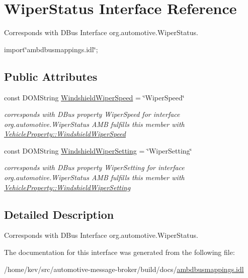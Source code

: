 \hypertarget{interfaceWiperStatus}{\section{Wiper\+Status Interface Reference}
\label{interfaceWiperStatus}
}


Corresponds with D\+Bus Interface org.\+automotive.\+Wiper\+Status.  




{\ttfamily import\char`\"{}ambdbusmappings.\+idl\char`\"{};}

\subsection*{Public Attributes}
\begin{DoxyCompactItemize}
\item 
\hypertarget{interfaceWiperStatus_a2450e48040a1ab0eacf41a069026801b}{const D\+O\+M\+String \hyperlink{interfaceWiperStatus_a2450e48040a1ab0eacf41a069026801b}{Windshield\+Wiper\+Speed} = \char`\"{}Wiper\+Speed\char`\"{}}\label{interfaceWiperStatus_a2450e48040a1ab0eacf41a069026801b}

\begin{DoxyCompactList}\small\item\em corresponds with D\+Bus property Wiper\+Speed for interface org.\+automotive.\+Wiper\+Status A\+M\+B fulfills this member with \hyperlink{classVehicleProperty_a00117ff074e7d12b38493455d1230b80}{Vehicle\+Property\+::\+Windshield\+Wiper\+Speed} \end{DoxyCompactList}\item 
\hypertarget{interfaceWiperStatus_a85849714f517ea47be7dded2874e4ed0}{const D\+O\+M\+String \hyperlink{interfaceWiperStatus_a85849714f517ea47be7dded2874e4ed0}{Windshield\+Wiper\+Setting} = \char`\"{}Wiper\+Setting\char`\"{}}\label{interfaceWiperStatus_a85849714f517ea47be7dded2874e4ed0}

\begin{DoxyCompactList}\small\item\em corresponds with D\+Bus property Wiper\+Setting for interface org.\+automotive.\+Wiper\+Status A\+M\+B fulfills this member with \hyperlink{classVehicleProperty_aedc65affd0ac592324226b51a0d1b877}{Vehicle\+Property\+::\+Windshield\+Wiper\+Setting} \end{DoxyCompactList}\end{DoxyCompactItemize}


\subsection{Detailed Description}
Corresponds with D\+Bus Interface org.\+automotive.\+Wiper\+Status. 

The documentation for this interface was generated from the following file\+:\begin{DoxyCompactItemize}
\item 
/home/kev/src/automotive-\/message-\/broker/build/docs/\hyperlink{ambdbusmappings_8idl}{ambdbusmappings.\+idl}\end{DoxyCompactItemize}
